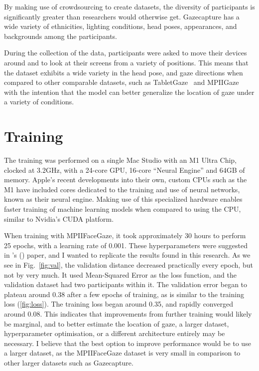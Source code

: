 \documentclass{report}
\newcommand\posscite[1]{\citeauthor{#1}'s (\citeyear{#1}) \cite{#1}}
\begin{document}
By making use of crowdsourcing to create datasets, the diversity of participants is significantly greater than researchers would otherwise get. Gazecapture has a wide variety of ethnicities, lighting conditions, head poses, appearances, and backgrounds among the participants.

During the collection of the data, participants were asked to move their devices around and to look at their screens from a variety of positions. This means that the dataset exhibits a wide variety in the head pose, and gaze directions when compared to other comparable datasets, such as TabletGaze~\cite{huang2016tabletgaze} and MPIIGaze~\cite{zhang15cvpr} with the intention that the model can better generalize the location of gaze under a variety of conditions.


\section{Training}
\label{sec:training}

The training was performed on a single Mac Studio with an M1 Ultra Chip, clocked at 3.2GHz, with a 24-core GPU, 16-core ``Neural Engine'' and 64GB of memory. Apple's recent developments into their own, custom CPUs such as the M1 have included cores dedicated to the training and use of neural networks, known as their neural engine. Making use of this specialized hardware enables faster training of machine learning models when compared to using the CPU, similar to Nvidia's CUDA platform. 

When training with MPIIFaceGaze, it took approximately 30 hours to perform 25 epochs, with a learning rate of 0.001. These hyperparameters were suggested in \posscite{krafka2016eye} paper, and I wanted to replicate the results found in this research. As we see in Fig.~\ref{fig:val}, the validation distance decreased practically every epoch, but not by very much. It used Mean-Squared Error as the loss function, and the validation dataset had two participants within it. The validation error began to plateau around 0.38 after a few epochs of training, as is similar to the training loss (\autoref{fig:loss}). The training loss began around 0.35, and rapidly converged around 0.08. This indicates that improvements from further training would likely be marginal, and to better estimate the location of gaze, a larger dataset, hyperparameter optimisation, or a different architecture entirely may be necessary. I believe that the best option to improve performance would be to use a larger dataset, as the MPIIFaceGaze dataset is very small in comparison to other larger datasets such as Gazecapture. 
\end{document}
